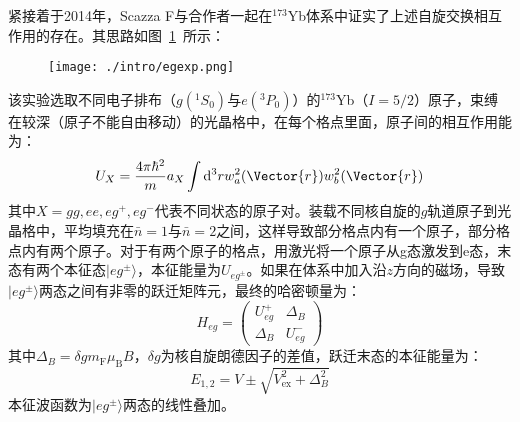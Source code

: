 紧接着于2014年，Scazza F\cite{scazza2014observation}与合作者一起在${}^{173}$Yb体系中证实了上述自旋交换相互作用的存在。其思路如图~\ref{egexp}~所示：
\begin{figure}[!htbp]
    \centering
    \texttt{[image: ./intro/egexp.png]}
    \label{egexp}
\end{figure}
该实验选取不同电子排布（$g({}^1S_0)$与$e({}^3P_0)$）的${}^{173}$Yb（$I=5/2$）原子，束缚在较深（原子不能自由移动）的光晶格中，在每个格点里面，原子间的相互作用能为：
\begin{equation}
U_{X}=\frac{4 \pi \hbar^{2}}{m} a_{X} \int \mathrm{d}^{3} r w_{a}^{2}(\Vector{r}) w_{b}^{2}(\Vector{r})
\end{equation}
其中$X =gg, ee, eg^+, eg^−$代表不同状态的原子对。装载不同核自旋的$g$轨道原子到光晶格中，平均填充在$\bar{n}=1$与$\bar{n}=2$之间，这样导致部分格点内有一个原子，部分格点内有两个原子。对于有两个原子的格点，用激光将一个原子从g态激发到e态，末态有两个本征态$|eg^\pm\rangle$，本征能量为$U_{eg^\pm}$。如果在体系中加入沿$z$方向的磁场，导致$|eg^\pm\rangle$两态之间有非零的跃迁矩阵元，最终的哈密顿量为：
\begin{equation}
H_{e g}=\left(\begin{array}{cc}
U_{e g}^{+} & \Delta_{B} \\
\Delta_{B} & U_{e g}^{-}
\end{array}\right)
\end{equation}
其中$\Delta_{B}=\delta g m_{\mathrm{F}} \mu_{\mathrm{B}} B$，$\delta g$为核自旋朗德因子的差值，跃迁末态的本征能量为：
\begin{equation}
E_{1,2}=V \pm \sqrt{V_{\mathrm{ex}}^{2}+\Delta_{B}^{2}}
\end{equation}
本征波函数为$|eg^\pm\rangle$两态的线性叠加。

\begin{comment}
如图~\ref{egd}~
\begin{figure}[!htbp]
    \centering
    \texttt{[image: chap1spexd.png]}
    \bicaption{图a代表实验测到的吸收谱，不同的峰代表了不同的末态。图b代表观测到自旋交换体系的的自旋动力学。摘自\citep{cappellini2014direct}}{Fig(A) for spectrum of clock transition. Fig(B) for time resolved spin transition. dynamics. Reprinted from \citep{cappellini2014direct}}
    \label{egd}
\end{figure}
\end{comment}

